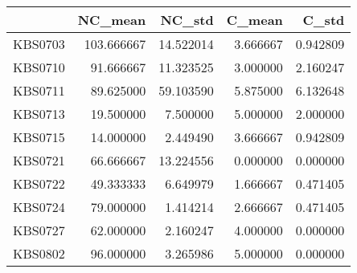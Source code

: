 \begin{tabular}{lrrrr}
\toprule
{} &     NC\_mean &     NC\_std &    C\_mean &     C\_std \\
\midrule
KBS0703 &  103.666667 &  14.522014 &  3.666667 &  0.942809 \\
KBS0710 &   91.666667 &  11.323525 &  3.000000 &  2.160247 \\
KBS0711 &   89.625000 &  59.103590 &  5.875000 &  6.132648 \\
KBS0713 &   19.500000 &   7.500000 &  5.000000 &  2.000000 \\
KBS0715 &   14.000000 &   2.449490 &  3.666667 &  0.942809 \\
KBS0721 &   66.666667 &  13.224556 &  0.000000 &  0.000000 \\
KBS0722 &   49.333333 &   6.649979 &  1.666667 &  0.471405 \\
KBS0724 &   79.000000 &   1.414214 &  2.666667 &  0.471405 \\
KBS0727 &   62.000000 &   2.160247 &  4.000000 &  0.000000 \\
KBS0802 &   96.000000 &   3.265986 &  5.000000 &  0.000000 \\
\bottomrule
\end{tabular}
